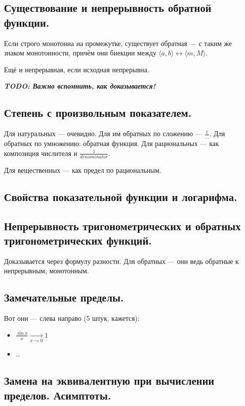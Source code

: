 \documentclass[12pt, a4paper]{article}
\begin{document}
\subsection{Существование и непрерывность обратной функции.}

Если строго монотонна на промежутке,
существует обратная — с таким же знаком монотонности, причём они биекции между $\langle a, b \rangle \leftrightarrow \langle m, M \rangle$.

Ещё и непрерывная, если исходная непрерывна.


\textbf{\emph{TODO: Важно вспомнить, как доказывается!}}


\subsection{Степень с произвольным показателем.}

Для натуральных — очевидно.
Для им обратных по сложению — $\frac{1}{…}$.
Для обратных по умножению: обратная функция.
Для рациональных — как композиция числителя и $\frac{1}{denominator}$.

Для вещественных — как предел по рациональным.


\subsection{Свойства показательной функции и логарифма.}

\subsection{Непрерывность тригонометрических и обратных тригонометрических функций.}

Доказывается через формулу разности.
Для обратных — они ведь обратные к непрерывным, монотонным.

\subsection{Замечательные пределы.}

Вот они — слева направо (5 штук, кажется):

\begin{itemize}
    \item $\frac{\sin x}{x} \underset{x \to 0}{\longrightarrow} 1$
    \item …
\end{itemize}

\subsection{Замена на эквивалентную при вычислении пределов. Асимптоты.}
\end{document}
